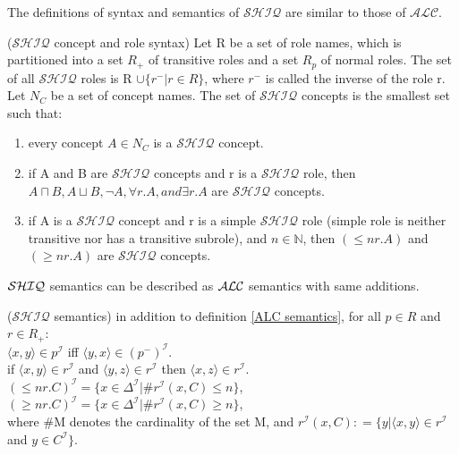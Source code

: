 The definitions of syntax and semantics of $\mathcal{SHIQ}$ are similar to those of $\mathcal{ALC}$.
\begin{mydef} 
\cite{handbook} ($\mathcal{SHIQ}$ concept and role syntax) Let R be a set of role names, which is partitioned into a set $R_+$ of transitive roles and a set $R_p$ of normal roles. 
The set of all $\mathcal{SHIQ}$ roles is R $\cup \{r^- | r \in R\}$, where $r^-$ is called the inverse of the role r. \\
Let $N_C$ be a set of concept names. The set of $\mathcal{SHIQ}$ concepts is the smallest set such that:  
\begin{enumerate}
\item every concept $A \in N_C$ is a $\mathcal{SHIQ}$ concept.
\item if A and B are $\mathcal{SHIQ}$ concepts and r is a $\mathcal{SHIQ}$ role, then $A\sqcap B, A\sqcup B,  \neg A, \forall r.A,  and \exists r.A$ are $\mathcal{SHIQ}$ concepts.
\item if A is a $\mathcal{SHIQ}$ concept and r is a simple $\mathcal{SHIQ}$ role (simple role is neither transitive nor has a transitive subrole), and $n \in \mathbb{N}$, then $(\leq n r.A)$  and 
$(\geq n r.A)$ are $\mathcal{SHIQ}$ concepts.
\end{enumerate}
\end{mydef}
$\mathcal{SHIQ}$ semantics can be described as $\mathcal{ALC}$ semantics with same additions.

 \begin{mydef}($\mathcal{SHIQ}$ semantics) \cite{handbook}
in addition to definition \ref{ALC semantics}, for all  $p \in R$ and $r \in R_+$: \\
 $\langle x,y \rangle \in p^\mathcal{I}$ iff  $\langle y,x \rangle \in (p^- )^\mathcal{I}$. \\
 if $\langle x,y \rangle \in r^\mathcal{I}$ and $ \langle y,z \rangle \in r^\mathcal{I}$ then $\langle x,z \rangle \in r^\mathcal{I}$.\\
 $(\leq n r.C)^\mathcal{I} = \{x \in \Delta ^\mathcal{I} | \# r^\mathcal{I} (x,C) \leq n\}$,\\
$(\geq n r.C)^\mathcal{I} = \{x \in \Delta ^\mathcal{I} | \# r^\mathcal{I} (x,C) \geq n\}$,\\

where \#M  denotes the cardinality of the set M, and $r^\mathcal{I} (x,C) \mathrel{\mathop:}= \{y | \langle x,y \rangle \in r^\mathcal{I}$ and $y \in C^\mathcal{I}\}$.
\end{mydef}

